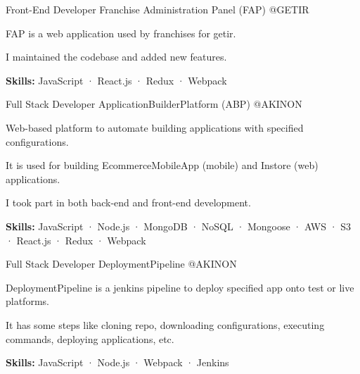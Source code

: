 \begin{cventries}
  \cventry
    {Front-End Developer} %
    {Franchise Administration Panel (FAP)} %
    {@GETIR} %
    {}
    {
      \begin{cvitems} %
        \item {FAP is a web application used by franchises for getir.}
        \item {I maintained the codebase and added new features.}
        \item {\textbf {Skills:} JavaScript · React.js · Redux · Webpack}
      \end{cvitems}
    }

  \cventry
    {Full Stack Developer} %
    {ApplicationBuilderPlatform (ABP)} %
    {@AKINON} %
    {}
    {
      \begin{cvitems} %
        \item {Web-based platform to automate building applications with specified configurations.}
        \item {It is used for building EcommerceMobileApp (mobile) and Instore (web) applications.}
        \item {I took part in both back-end and front-end development.}
        \item {\textbf {Skills:} JavaScript · Node.js · MongoDB · NoSQL · Mongoose · AWS · S3 · React.js · Redux · Webpack}
      \end{cvitems}
    }

  \cventry
    {Full Stack Developer} %
    {DeploymentPipeline} %
    {@AKINON} %
    {}
    {
      \begin{cvitems} %
        \item {DeploymentPipeline is a jenkins pipeline to deploy specified app onto test or live platforms.}
        \item {It has some steps like cloning repo, downloading configurations, executing commands, deploying applications, etc.}
        \item {\textbf {Skills:} JavaScript · Node.js · Webpack · Jenkins}
      \end{cvitems}
    }


\end{cventries}
